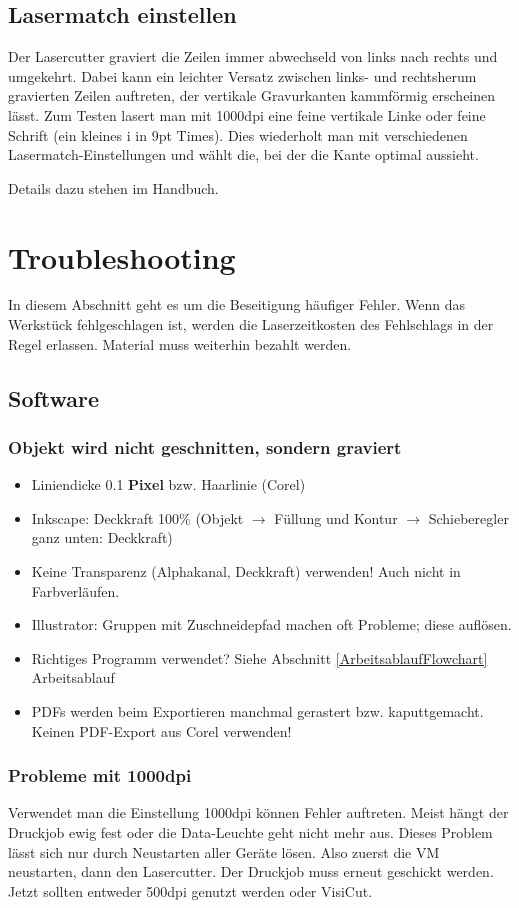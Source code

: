 \documentclass{\basedir/fablab-document}
\begin{document}
\subsection{Lasermatch einstellen}
Der Lasercutter graviert die Zeilen immer abwechseld von links nach rechts und umgekehrt. Dabei kann ein leichter Versatz zwischen links- und rechtsherum gravierten Zeilen auftreten, der vertikale Gravurkanten kammförmig erscheinen lässt. Zum Testen lasert man mit 1000dpi eine feine vertikale Linke oder feine Schrift (ein kleines i in 9pt Times). Dies wiederholt man mit verschiedenen Lasermatch-Einstellungen und wählt die, bei der die Kante optimal aussieht.

Details dazu stehen im Handbuch.

\section{Troubleshooting}
In diesem Abschnitt geht es um die Beseitigung häufiger Fehler. Wenn das Werkstück fehlgeschlagen ist, werden die Laserzeitkosten des Fehlschlags in der Regel erlassen. Material muss weiterhin bezahlt werden.

\subsection{Software}
\subsubsection{Objekt wird nicht geschnitten, sondern graviert}
\begin{itemize}
 \item Liniendicke 0.1 \textbf{Pixel} bzw. Haarlinie (Corel)
 \item Inkscape: Deckkraft 100\% (Objekt $\rightarrow$ Füllung und Kontur $\rightarrow$ Schieberegler ganz unten: Deckkraft)
 \item Keine Transparenz (Alphakanal, Deckkraft) verwenden! Auch nicht in Farbverläufen.
 \item Illustrator: Gruppen mit Zuschneidepfad machen oft Probleme; diese auflösen.
 \item Richtiges Programm verwendet? Siehe Abschnitt \ref{ArbeitsablaufFlowchart} Arbeitsablauf
 \item PDFs werden beim Exportieren manchmal gerastert bzw. kaputtgemacht. Keinen PDF-Export aus Corel verwenden!
\end{itemize}


\subsubsection{Probleme mit 1000dpi}
Verwendet man die Einstellung 1000dpi können Fehler auftreten. Meist hängt der Druckjob ewig fest oder die Data-Leuchte geht nicht mehr aus. Dieses Problem lässt sich nur durch Neustarten aller Geräte lösen. Also zuerst die VM neustarten, dann den Lasercutter. Der Druckjob muss erneut geschickt werden. Jetzt sollten entweder 500dpi genutzt werden oder VisiCut.
\end{document}
